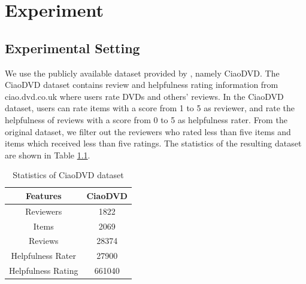 \documentclass[master,english,final]{kaist-ucs}
\begin{document}

\chapter{Experiment}
\section{Experimental Setting}
We use the publicly available dataset provided by \cite{ETAF}, namely CiaoDVD.
The CiaoDVD dataset contains review and helpfulness rating information from ciao.dvd.co.uk where users rate DVDs and others’ reviews.
In the CiaoDVD dataset, users can rate items with a score from 1 to 5 as reviewer, and rate the helpfulness of reviews with a score from 0 to 5 as helpfulness rater.
From the original dataset, we filter out the reviewers who rated less than five items and items which received less than five ratings.
The statistics of the resulting dataset are shown in Table \ref{tableCiaoDVD}.
\begin{table}[h]
\caption{Statistics of CiaoDVD dataset}
\label{tableCiaoDVD}
\begin{center}
\begin{tabular} {|c|c|}
\hline
\textbf{Features} & \textbf{CiaoDVD} \\ \hline
Reviewers & 1822 \\ \hline
Items & 2069 \\ \hline
Reviews & 28374 \\ \hline
Helpfulness Rater & 27900 \\ \hline
Helpfulness Rating & 661040 \\ \hline
\end{tabular}
\end{center}
\end{table}
\end{document}
